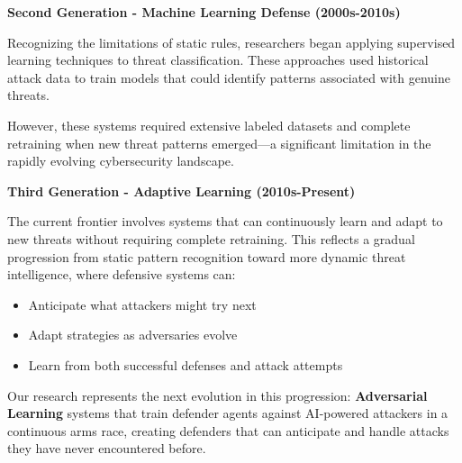\documentclass[12pt,oneside,a4paper]{article}
\theoremstyle{definition}
\theoremstyle{plain}
\begin{document}
\textbf{Second Generation - Machine Learning Defense (2000s-2010s)}

Recognizing the limitations of static rules, researchers began applying supervised learning techniques to threat classification. These approaches used historical attack data to train models that could identify patterns associated with genuine threats. 

However, these systems required extensive labeled datasets and complete retraining when new threat patterns emerged—a significant limitation in the rapidly evolving cybersecurity landscape.

\textbf{Third Generation - Adaptive Learning (2010s-Present)}

The current frontier involves systems that can continuously learn and adapt to new threats without requiring complete retraining. This reflects a gradual progression from static pattern recognition toward more dynamic threat intelligence, where defensive systems can:
\begin{itemize}
    \item Anticipate what attackers might try next
    \item Adapt strategies as adversaries evolve
    \item Learn from both successful defenses and attack attempts
\end{itemize}

Our research represents the next evolution in this progression: \textbf{Adversarial Learning} systems that train defender agents against AI-powered attackers in a continuous arms race, creating defenders that can anticipate and handle attacks they have never encountered before.
\end{document}
